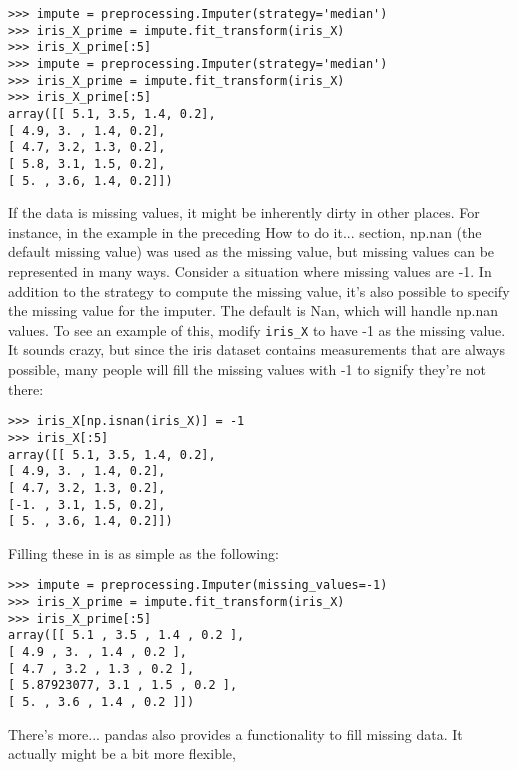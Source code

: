 \documentclass[SKL-MASTER.tex]{subfiles}
\begin{document}
\begin{framed}
\begin{verbatim}
>>> impute = preprocessing.Imputer(strategy='median')
>>> iris_X_prime = impute.fit_transform(iris_X)
>>> iris_X_prime[:5]
>>> impute = preprocessing.Imputer(strategy='median')
>>> iris_X_prime = impute.fit_transform(iris_X)
>>> iris_X_prime[:5]
array([[ 5.1, 3.5, 1.4, 0.2],
[ 4.9, 3. , 1.4, 0.2],
[ 4.7, 3.2, 1.3, 0.2],
[ 5.8, 3.1, 1.5, 0.2],
[ 5. , 3.6, 1.4, 0.2]])
\end{verbatim}
\end{framed}
If the data is missing values, it might be inherently dirty in other places. For instance, in the
example in the preceding How to do it... section, np.nan (the default missing value) was
used as the missing value, but missing values can be represented in many ways. Consider
a situation where missing values are -1. In addition to the strategy to compute the missing
value, it's also possible to specify the missing value for the imputer. The default is Nan,
which will handle np.nan values.
To see an example of this, modify \texttt{iris\_X} to have -1 as the missing value. It sounds crazy,
but since the iris dataset contains measurements that are always possible, many people
will fill the missing values with -1 to signify they're not there:
\begin{framed}
\begin{verbatim}
>>> iris_X[np.isnan(iris_X)] = -1
>>> iris_X[:5]
array([[ 5.1, 3.5, 1.4, 0.2],
[ 4.9, 3. , 1.4, 0.2],
[ 4.7, 3.2, 1.3, 0.2],
[-1. , 3.1, 1.5, 0.2],
[ 5. , 3.6, 1.4, 0.2]])
\end{verbatim}
\end{framed}
Filling these in is as simple as the following:
\begin{framed}
	\begin{verbatim}
>>> impute = preprocessing.Imputer(missing_values=-1)
>>> iris_X_prime = impute.fit_transform(iris_X)
>>> iris_X_prime[:5]
array([[ 5.1 , 3.5 , 1.4 , 0.2 ],
[ 4.9 , 3. , 1.4 , 0.2 ],
[ 4.7 , 3.2 , 1.3 , 0.2 ],
[ 5.87923077, 3.1 , 1.5 , 0.2 ],
[ 5. , 3.6 , 1.4 , 0.2 ]])
\end{verbatim}
\end{framed}
There's more...
pandas also provides a functionality to fill missing data. It actually might be a bit more flexible,
\end{document}
